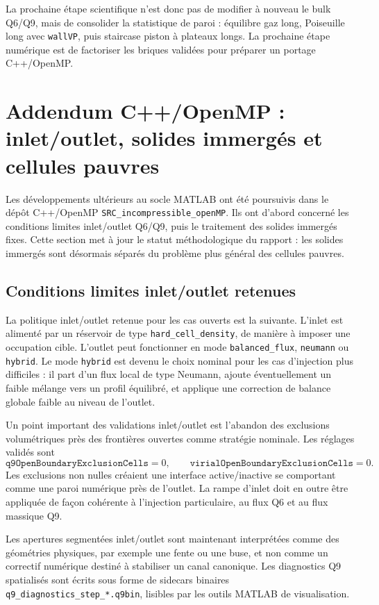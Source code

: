 \documentclass[11pt,a4paper]{article}
\begin{document}
La prochaine étape scientifique n'est donc pas de modifier à nouveau le bulk Q6/Q9, mais de consolider la statistique de paroi : équilibre gaz long, Poiseuille long avec \texttt{wallVP}, puis staircase piston à plateaux longs. La prochaine étape numérique est de factoriser les briques validées pour préparer un portage C++/OpenMP.




\section{Addendum C++/OpenMP : inlet/outlet, solides immergés et cellules pauvres}

Les développements ultérieurs au socle MATLAB ont été poursuivis dans le dépôt C++/OpenMP \texttt{SRC\_incompressible\_openMP}. Ils ont d'abord concerné les conditions limites inlet/outlet Q6/Q9, puis le traitement des solides immergés fixes. Cette section met à jour le statut méthodologique du rapport : les solides immergés sont désormais séparés du problème plus général des cellules pauvres.

\subsection{Conditions limites inlet/outlet retenues}

La politique inlet/outlet retenue pour les cas ouverts est la suivante. L'inlet est alimenté par un réservoir de type \texttt{hard\_cell\_density}, de manière à imposer une occupation cible. L'outlet peut fonctionner en mode \texttt{balanced\_flux}, \texttt{neumann} ou \texttt{hybrid}. Le mode \texttt{hybrid} est devenu le choix nominal pour les cas d'injection plus difficiles : il part d'un flux local de type Neumann, ajoute éventuellement un faible mélange vers un profil équilibré, et applique une correction de balance globale faible au niveau de l'outlet.

Un point important des validations inlet/outlet est l'abandon des exclusions volumétriques près des frontières ouvertes comme stratégie nominale. Les réglages validés sont
\[
  \texttt{q9OpenBoundaryExclusionCells}=0,\qquad
  \texttt{virialOpenBoundaryExclusionCells}=0.
\]
Les exclusions non nulles créaient une interface active/inactive se comportant comme une paroi numérique près de l'outlet. La rampe d'inlet doit en outre être appliquée de façon cohérente à l'injection particulaire, au flux Q6 et au flux massique Q9.

Les apertures segmentées inlet/outlet sont maintenant interprétées comme des géométries physiques, par exemple une fente ou une buse, et non comme un correctif numérique destiné à stabiliser un canal canonique. Les diagnostics Q9 spatialisés sont écrits sous forme de sidecars binaires \texttt{q9\_diagnostics\_step\_*.q9bin}, lisibles par les outils MATLAB de visualisation.
\end{document}

